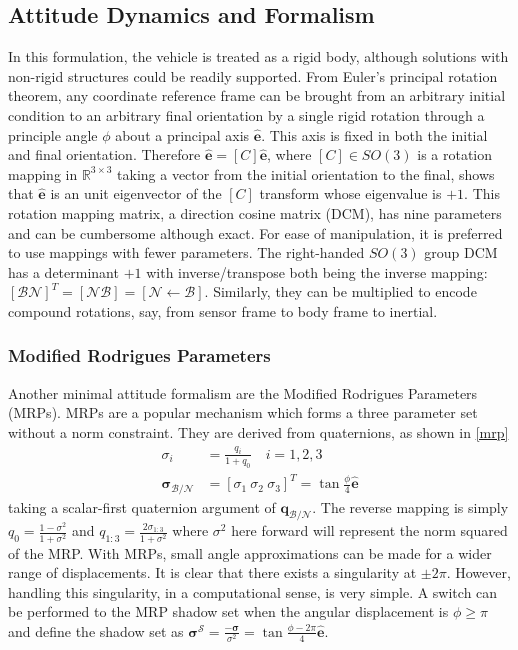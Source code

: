 \documentclass[conf]{new-aiaa}
\begin{document}
\subsection{Attitude Dynamics and Formalism}
In this formulation, the vehicle is treated as a rigid body, although solutions with non-rigid structures could be readily supported. From Euler's principal rotation theorem,  any coordinate reference frame can be brought from an arbitrary initial condition to an arbitrary final orientation by a single rigid rotation through a principle angle $\phi$ about a principal axis $\hat{\bm{e}}$. This axis is fixed in both the initial and final orientation. Therefore $\hat{\bm{e}} = [C]\hat{\bm{e}}$, where $[C]\in SO(3)$ is a rotation mapping in $\mathbb{R}^{3\times3}$ taking a vector from the initial orientation to the final, shows that $\hat{\bm{e}}$ is an unit eigenvector of the $[C]$ transform whose eigenvalue is $+1$. This rotation mapping matrix, a direction cosine matrix (DCM), has nine parameters and can be cumbersome although exact. For ease of manipulation, it is preferred to use mappings with fewer parameters. The right-handed $SO(3)$ group DCM has a determinant $+1$ with inverse/transpose both being the inverse mapping: $[\mathcal{B}\mathcal{N}]^T = [\mathcal{N}\mathcal{B}] = [\mathcal{N} \leftarrow \mathcal{B}]$. Similarly, they can be multiplied to encode compound rotations, say, from sensor frame to body frame to inertial.

\subsubsection{Modified Rodrigues Parameters}
Another minimal attitude formalism are the Modified Rodrigues Parameters (MRPs). 
MRPs are a popular mechanism which forms a three parameter set without a norm constraint. They are derived from quaternions, as shown in \ref{mrp}
%
\begin{align}
\label{mrp}
	\sigma_i &= \frac{q_i}{1+q_0} \quad i = 1,2,3 \\
	\boldsymbol{\sigma}_\mathcal{B/N} &= [\sigma_1 \ \sigma_2 \ \sigma_3]^T = \tan\frac{\phi}{4}\hat{\bm{e}}
\end{align}
taking a scalar-first quaternion argument of $\bm{q}_\mathcal{B/N}$. The reverse mapping is simply $q_0 = \frac{1-\sigma^2}{1+\sigma^2}$ and $q_{1:3} = \frac{2\sigma_{1:3}}{1+\sigma^2}$ where $\sigma^2$ here forward will represent the norm squared of the MRP. With MRPs, small angle approximations can be made for a wider range of displacements. It is clear that there exists a singularity at $\pm 2\pi$. However, handling this singularity, in a computational sense, is very simple. A switch can be performed to the MRP shadow set when the angular displacement is $\phi \geq \pi$ and define the shadow set as $\boldsymbol{\sigma}^\mathcal{S} = \frac{-\boldsymbol{\sigma}}{\sigma^2} = \tan{\frac{\phi-2\pi}{4}}\hat{\bm{e}}$. 
\end{document}
